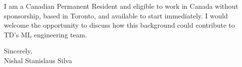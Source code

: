 \documentclass[11pt]{article}
\begin{document}
\vspace{1em}

\noindent I am a Canadian Permanent Resident and eligible to work in Canada without sponsorship, based in Toronto, and available to start immediately. I would welcome the opportunity to discuss how this background could contribute to TD's ML engineering team.

\vspace{1.5em}

\noindent Sincerely, \\
Nishal Stanislaus Silva
\end{document}
